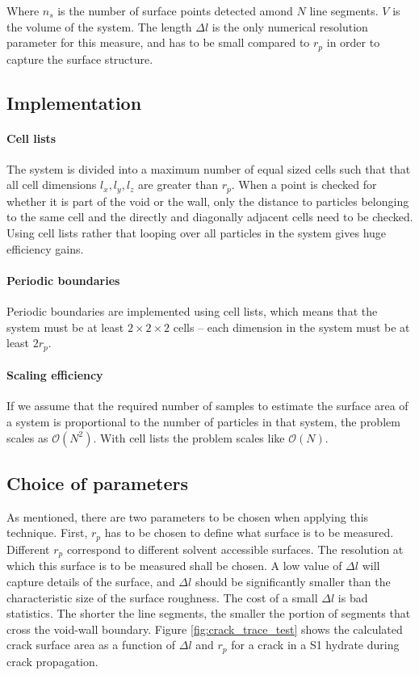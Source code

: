 Where $n_s$ is the number of surface points detected amond $N$ line segments. $V$ is the volume of the system. The length $\Delta l$ is the only numerical resolution parameter for this measure, and has to be small compared to $r_p$ in order to capture the surface structure. 

\subsection{Implementation}
\paragraph{Cell lists}
The system is divided into a maximum number of equal sized cells such that that all cell dimensions $l_x, l_y, l_z$ are greater than $r_p$. When a point is checked for whether it is part of the void or the wall, only the distance to particles belonging to the same cell and the directly and diagonally adjacent cells need to be checked. Using cell lists rather that looping over all particles in the system gives huge efficiency gains.
\paragraph{Periodic boundaries}
Periodic boundaries are implemented using cell lists, which means that the system must be at least $2\times 2 \times 2$ cells – each dimension in the system must be at least $2r_p$.
\paragraph{Scaling efficiency}
If we assume that the required number of samples to estimate the surface area of a system is proportional to the number of particles in that system, the problem scales as $\mathcal{O}(N^2)$. With cell lists the problem scales like $\mathcal{O}(N)$.

\subsection{Choice of parameters}
As mentioned, there are two parameters to be chosen when applying this technique. First, $r_p$ has to be chosen to define what surface is to be measured. Different $r_p$ correspond to different solvent accessible surfaces. The resolution at which this surface is to be measured shall be chosen. A low value of $\Delta l$ will capture details of the surface, and $\Delta l$ should be significantly smaller than the characteristic size of the surface roughness. The cost of a small $\Delta l$ is bad statistics. The shorter the line segments, the smaller the portion of segments that cross the void-wall boundary. Figure \ref{fig:crack_trace_test} shows the calculated crack surface area as a function of $\Delta l$ and $r_p$ for a crack in a S1 hydrate during crack propagation. 

